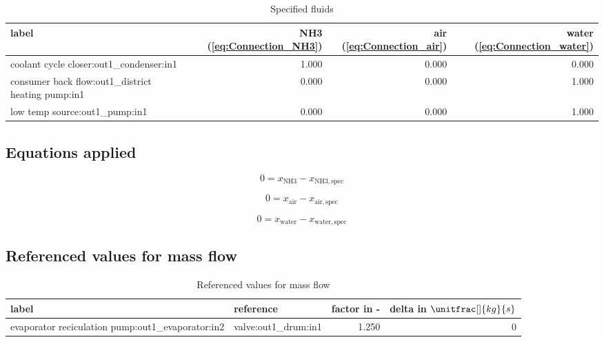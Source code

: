\begin{table}[H]\begin{center}
\begin{tabular}{lrrr}
\toprule
                                              label &  NH3 (\ref{eq:Connection_NH3}) &  air (\ref{eq:Connection_air}) &  water (\ref{eq:Connection_water}) \\
\midrule
           coolant cycle closer:out1\_condenser:in1 &                          1.000 &                          0.000 &                              0.000 \\
 consumer back flow:out1\_district heating pump:in1 &                          0.000 &                          0.000 &                              1.000 \\
                     low temp source:out1\_pump:in1 &                          0.000 &                          0.000 &                              1.000 \\
\bottomrule
\end{tabular}
\caption{Specified fluids}
\end{center}\end{table}

\subsection{Equations applied}

\begin{equation}
\label{eq:Connection_NH3}
0 = x_\mathrm{NH3} - x_\mathrm{NH3,spec}
\end{equation}

\begin{equation}
\label{eq:Connection_air}
0 = x_\mathrm{air} - x_\mathrm{air,spec}
\end{equation}

\begin{equation}
\label{eq:Connection_water}
0 = x_\mathrm{water} - x_\mathrm{water,spec}
\end{equation}

\subsection{Referenced values for mass flow}

\begin{table}[H]\begin{center}
\begin{tabular}{llrr}
\toprule
                                             label &             reference &  factor in - &  delta in $\unitfrac[]{kg}{s}$ \\
\midrule
 evaporator reciculation pump:out1\_evaporator:in2 &  valve:out1\_drum:in1 &        1.250 &                              0 \\
\bottomrule
\end{tabular}
\caption{Referenced values for mass flow}
\end{center}\end{table}


